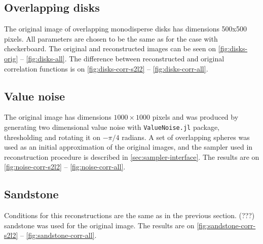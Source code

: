 \documentclass[preprint,amsmath,amssymb,aps,pre,nofootinbib]{revtex4-1}
\newcommand{\code}[1]{\colorbox{light-gray}{\texttt{#1}}}
\begin{document}
\subsection{Overlapping disks}
The original image of overlapping monodisperse disks has dimensions 500x500
pixels. All parameters are chosen to be the same as for the case with
checkerboard. The original and reconstructed images can be seen on
\cref{fig:disks-orig} -- \cref{fig:disks-all}. The difference between
reconstructed and original correlation functions is on
\cref{fig:disks-corr-s2l2} -- \cref{fig:disks-corr-all}.

\subsection{Value noise}
The original image has dimensions $1000 \times 1000$ pixels and was produced by
generating two dimensional value noise with \code{ValueNoise.jl} package,
thresholding and rotating it on $-\pi/4$ radians. A set of overlapping spheres
was used as an initial approximation of the original images, and the sampler
used in reconstruction procedure is described in \cref{sec:sampler-interface}.
The results are on \cref{fig:noise-corr-s2l2} -- \cref{fig:noise-corr-all}.

\subsection{Sandstone}
Conditions for this reconstructions are the same as in the previous
section. (???) sandstone was used for the original image. The results are on
\cref{fig:sandstone-corr-s2l2} -- \cref{fig:sandstone-corr-all}.
\end{document}
